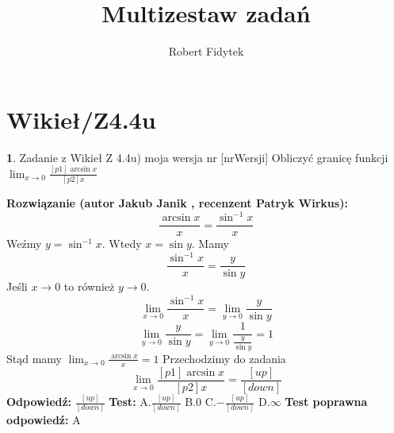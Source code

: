 \documentclass[12pt, a4paper]{article}
\title{Multizestaw zadań}
\author{Robert Fidytek}
\date{}
\theoremstyle{definition} %
\newtheorem{zad}{}
\newcommand{\kategoria}[1]{\section{#1}} %
\newcommand{\zadStart}[1]{\begin{zad}#1\newline} %
\newcommand{\zadStop}{\end{zad}}   %
\newcommand{\rozwStart}[2]{\noindent \textbf{Rozwiązanie (autor #1 , recenzent #2): }\newline} %
\newcommand{\rozwStop}{\newline}                                            %
\newcommand{\odpStart}{\noindent \textbf{Odpowiedź:}\newline}    %
\newcommand{\odpStop}{\newline}                                             %
\newcommand{\testStart}{\noindent \textbf{Test:}\newline} %
\newcommand{\testStop}{\newline} %
\newcommand{\kluczStart}{\noindent \textbf{Test poprawna odpowiedź:}\newline} %
\newcommand{\kluczStop}{\newline} %
\begin{document}
\maketitle


\kategoria{Wikieł/Z4.4u}
\zadStart{Zadanie z Wikieł Z 4.4u) moja wersja nr [nrWersji]}
Obliczyć granicę funkcji $\lim_{x \to 0} \frac{[p1]\arcsin{x}}{[p2]x}$
\zadStop
\rozwStart{Jakub Janik}{Patryk Wirkus}
$$\frac{\arcsin{x}}{x}=\frac{\sin^{-1}{x}}{x}$$
Weźmy $y=\sin^{-1}{x}$. Wtedy $x=\sin{y}$. Mamy
$$\frac{\sin^{-1}{x}}{x}=\frac{y}{\sin{y}}$$
Jeśli $x \to 0$ to również $y \to 0$.
$$\lim_{x \to 0}\frac{\sin^{-1}{x}}{x}=\lim_{y \to 0}\frac{y}{\sin{y}}$$
$$\lim_{y \to 0}\frac{y}{\sin{y}}=\lim_{y \to 0}\frac{1}{\frac{y}{\sin{y}}}=1$$
Stąd mamy $\lim_{x \to 0}\frac{\arcsin{x}}{x}=1$
Przechodzimy do zadania
$$\lim_{x \to 0} \frac{[p1]\arcsin{x}}{[p2]x}=\frac{[up]}{[down]}$$
\rozwStop
\odpStart
$\frac{[up]}{[down]}$
\odpStop
\testStart
A.$\frac{[up]}{[down]}$
B.$0$
C.$-\frac{[up]}{[down]}$
D.$\infty$
\testStop
\kluczStart
A
\kluczStop
\end{document}
